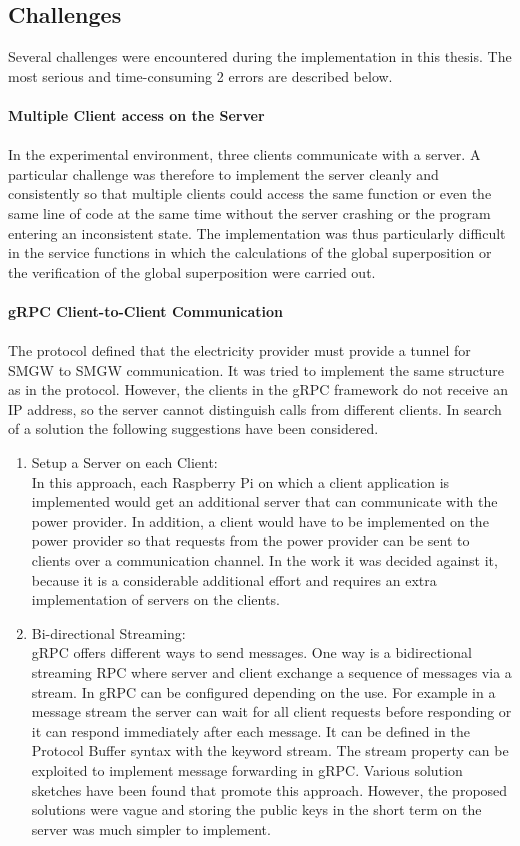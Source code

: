 \subsection{Challenges}
Several challenges were encountered during the implementation in this thesis. The most serious and time-consuming 2 errors are described below.\\
\\
\textbf{Multiple Client access on the Server}
\\
\\ 
In the experimental environment, three clients communicate with a server. A particular challenge was therefore to implement the server cleanly and consistently so that multiple clients could access the same function or even the same line of code at the same time without the server crashing or the program entering an inconsistent state. The implementation was thus particularly difficult in the service functions in which the calculations of the global superposition or the verification of the global superposition were carried out.%
\\
\\
\textbf{gRPC Client-to-Client Communication}
\\
\\
The protocol defined that the electricity provider must provide a tunnel for \gls{SMGW} to \gls{SMGW} communication. It was tried to implement the same structure as in the protocol. However, the clients in the gRPC framework do not receive an \gls{IP} address, so the server cannot distinguish calls from different clients. In search of a solution the following suggestions have been considered. 
\begin{enumerate}
\item Setup a Server on each Client:\\
In this approach, each Raspberry Pi on which a client application is implemented would get an additional server that can communicate with the power provider. In addition, a client would have to be implemented on the power provider so that requests from the power provider can be sent to clients over a communication channel. In the work it was decided against it, because it is a considerable additional effort and requires an extra implementation of servers on the clients.
\item Bi-directional Streaming:\\
gRPC offers different ways to send messages. One way is a bidirectional streaming RPC where server and client exchange a sequence of messages via a stream. In gRPC can be configured depending on the use.
For example in a message stream the server can wait for all client requests before responding or it can respond immediately after each message. It can be defined in the Protocol Buffer syntax with the keyword stream. The stream property can be exploited to implement message forwarding in gRPC. Various solution sketches have been found that promote this approach. However, the proposed solutions were vague and storing the public keys in the short term on the server was much simpler to implement. 
\end{enumerate}\\
